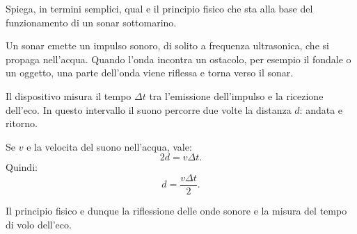 
\begin{esercizio}
Spiega, in termini semplici, qual e il principio fisico che sta alla base del
funzionamento di un sonar sottomarino.
\end{esercizio}

\begin{soluzione}
Un sonar emette un impulso sonoro, di solito a frequenza ultrasonica, che si
propaga nell'acqua. Quando l'onda incontra un ostacolo, per esempio il fondale
o un oggetto, una parte dell'onda viene riflessa e torna verso il sonar.

Il dispositivo misura il tempo \(\Delta t\) tra l'emissione dell'impulso e la
ricezione dell'eco. In questo intervallo il suono percorre due volte la
distanza \(d\): andata e ritorno.

Se \(v\) e la velocita del suono nell'acqua, vale:
\[
2d=v\Delta t.
\]
Quindi:
\[
d=\frac{v\Delta t}{2}.
\]

Il principio fisico e dunque la riflessione delle onde sonore e la misura del
tempo di volo dell'eco.
\end{soluzione}
